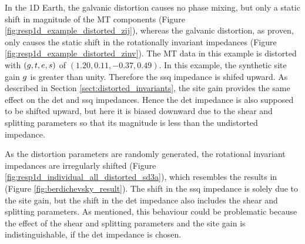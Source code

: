  
	In the 1D Earth, the galvanic distortion causes no phase mixing, but only a static shift in magnitude of the MT components (Figure \ref{fig:resp1d_example_distorted_zij}), whereas the galvanic distortion, as proven, only causes the static shift in the rotationally invariant impedances (Figure \ref{fig:resp1d_example_distorted_zinv}). The MT data in this example is distorted with $(g,t,e,s)$ of $(1.20,0.11,-0.37,0.49)$.
	In this example, the synthetic site gain $g$ is greater than unity. Therefore the ssq impedance is shifed upward. As described in Section \ref{sect:distorted_invariants}, the site gain provides the same effect on the det and ssq impedances. Hence the det impedance is also supposed to be shifted upward, but here it is biased downward due to the shear and splitting parameters so that its magnitude is less than the undistorted impedance. 


	
		
	As the distortion parameters are randomly generated, the rotational invariant impedances are irregularly shifted (Figure \ref{fig:resp1d_individual_all_distorted_sd3a}), which resembles the results in \citet{berdichevsky1980a} (Figure \ref{fig:berdichevsky_result}). 
	The shift in the ssq impedance is solely due to the site gain, but the shift in the det impedance also includes the shear and splitting parameters. 
	As mentioned, this behaviour could be problematic because the effect of the shear and splitting parameters and the site gain is indistinguishable, if the det impedance is chosen.



 

